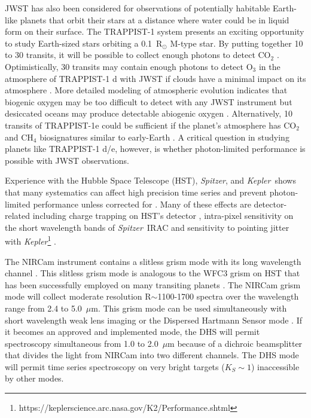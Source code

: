 \documentclass{aastex62}
\newcommand{\spitzer}{{\it Spitzer}}
\newcommand{\kepler}{{\it Kepler}}
\begin{document}
JWST has also been considered for observations of potentially habitable Earth-like planets that orbit their stars at a distance where water could be in liquid form on their surface.
The TRAPPIST-1 system \citep{gillon2016trappist1Discovery,gillon2017trappist-1sevenp} presents an exciting opportunity to study Earth-sized stars orbiting a 0.1~R$_\odot$ M-type star.
By putting together 10 to 30 transits, it will be possible to collect enough photons to detect CO$_2$ \citep{barstow2016trappist1habitable,krissansen-totton2018trappist1eJWST,lustig-yaeger2019detectabilityTRAPPIST-1}.
Optimistically, 30 transits may contain enough photons to detect O$_3$ in the atmosphere of TRAPPIST-1 d with JWST if clouds have a minimal impact on its atmosphere \citep{barstow2016trappist1habitable}.
More detailed modeling of atmospheric evolution indicates that biogenic oxygen may be too difficult to detect with any JWST instrument but desiccated oceans may produce detectable abiogenic oxygen \citep{lustig-yaeger2019detectabilityTRAPPIST-1}.
Alternatively, 10 transits of TRAPPIST-1e could be sufficient if the planet's atmosphere has CO$_2$ and CH$_4$ biosignatures similar to early-Earth \citep{krissansen-totton2018trappist1eJWST}.
A critical question in studying planets like TRAPPIST-1 d/e, however, is whether photon-limited performance is possible with JWST observations.

Experience with the Hubble Space Telescope (HST), \spitzer, and \kepler\ shows that many systematics can affect high precision time series and prevent photon-limited performance unless corrected for \citep[e.g.][]{beichman2014pasp}.
Many of these effects are detector-related including charge trapping on HST's detector \citep{berta2012flat_gj1214,zhou2017chargeTrap}, intra-pixel sensitivity on the short wavelength bands of \spitzer\ IRAC \citep{moralesCalderon2006LdwarfsWeatherIPC} and sensitivity to pointing jitter with \kepler\footnote{https://keplerscience.arc.nasa.gov/K2/Performance.shtml} \citep{beichman2014pasp}.

The NIRCam instrument \citep{rieke2005nircamSPIE} contains a slitless grism mode with its long wavelength channel \citep{greene2017jatisNIRCam}.
This slitless grism mode is analogous to the WFC3 grism on HST that has been successfully employed on many transiting planets \citep[e.g.][]{deming13,kreidberg2014wasp43,sing2016continuum,wakeford2017hatp26}.
The NIRCam grism mode will collect moderate resolution R$\sim$1100-1700 spectra over the wavelength range from 2.4 to 5.0~$\mu$m.
This grism mode can be used simultaneously with short wavelength weak lens imaging or the Dispersed Hartmann Sensor mode \citep{schlawin2017dhs}. If it becomes an approved and implemented mode, the DHS will permit spectroscopy simultaneous from 1.0 to 2.0~$\mu$m because of a dichroic beamsplitter that divides the light from NIRCam into two different channels.
The DHS mode will permit time series spectroscopy on very bright targets ($K_S \sim 1$) inaccessible by other modes.
\end{document}
